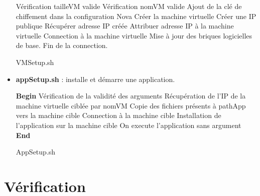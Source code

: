 \documentclass{report}
\begin{document}
\begin{itemize}
\begin{algorithm}[H]
          Vérification tailleVM valide\;
          Vérification nomVM valide\;
          Ajout de la clé de chiffement dans la configuration Nova\;
          Créer la machine virtuelle\;
          Créer une IP publique\;
          Récupérer adresse IP créée\;
          Attribuer adresse IP à la machine virtuelle\;
          Connection à la machine virtuelle\;
          Mise à jour des briques logicielles de base.
          Fin de la connection.
     \caption{VMSetup.sh}
    \end{algorithm}
           
    \item %
    \textbf{appSetup.sh} : installe et démarre une application.\newline
        
        \begin{algorithm}[H]
          \SetAlgoLined
         \textbf{Begin}\newline
          Vérification de la validité des arguments\;
          Récupération de l'IP de la machine virtuelle ciblée par nomVM\;
          Copie des fichiers présents à pathApp vers la machine cible\;
          Connection à la machine cible\;
          Installation de l'application sur la machine cible\;
          {
            On execute l'application sans argument\;
          }
          \textbf{End}
        
     \caption{AppSetup.sh}
    \end{algorithm}
    \bigbreak

    \end{itemize}
  

    \section{Vérification}
\end{document}
